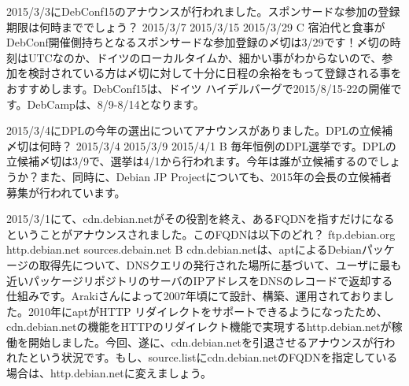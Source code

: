 %

\santaku
{2015/3/3にDebConf15のアナウンスが行われました。スポンサードな参加の登録期限は何時まででしょう？}
{2015/3/7}
{2015/3/15}
{2015/3/29}
{C}
{宿泊代と食事がDebConf開催側持ちとなるスポンサードな参加登録の〆切は3/29です！〆切の時刻はUTCなのか、ドイツのローカルタイムか、細かい事がわからないので、参加を検討されている方は〆切に対して十分に日程の余裕をもって登録される事をおすすめします。DebConf15は、ドイツ ハイデルバーグで2015/8/15-22の開催です。DebCampは、8/9-8/14となります。}

\santaku
{2015/3/4にDPLの今年の選出についてアナウンスがありました。DPLの立候補〆切は何時？}
{2015/3/4}
{2015/3/9}
{2015/4/1}
{B}
{毎年恒例のDPL選挙です。DPLの立候補〆切は3/9で、選挙は4/1から行われます。今年は誰が立候補するのでしょうか？また、同時に、Debian JP Projectについても、2015年の会長の立候補者募集が行われています。}

\santaku
{2015/3/1にて、cdn.debian.netがその役割を終え、あるFQDNを指すだけになるということがアナウンスされました。このFQDNは以下のどれ？}
{ftp.debian.org}
{http.debian.net}
{sources.debain.net}
{B}
{cdn.debian.netは、aptによるDebianパッケージの取得先について、DNSクエリの発行された場所に基づいて、ユーザに最も近いパッケージリポジトリのサーバのIPアドレスをDNSのレコードで返却する仕組みです。Arakiさんによって2007年頃にて設計、構築、運用されておりました。2010年にaptがHTTP リダイレクトをサポートできるようになったため、cdn.debian.netの機能をHTTPのリダイレクト機能で実現するhttp.debian.netが稼働を開始しました。今回、遂に、cdn.debian.netを引退させるアナウンスが行われたという状況です。もし、source.listにcdn.debian.netのFQDNを指定している場合は、http.debian.netに変えましょう。}


